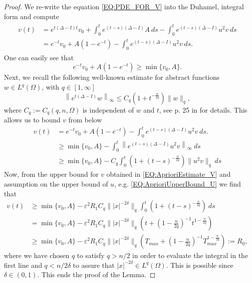 \documentclass[12pt, a4paper]{article}
\theoremstyle{break}
\theoremstyle{break}
\theoremstyle{break}
\theoremstyle{break}
\theoremstyle{break}
\theoremstyle{break}
\theoremstyle{break}
\begin{document}
\begin{proof}
    We re-write the equation \eqref{EQ:PDE_FOR_V} into the Duhamel, integral form and compute
    \begin{align}
        \begin{split}
            \label{EQ:Duhamel_FOR_V}
            v(t) 
            &= e^{t(\Delta - I) t} v_0 + \int_0^t e^{(t-s)(\Delta - I)} A\:ds - \int_0^t e^{(t-s)(\Delta - I)} u^2 v\:ds \\
            &= e^{-t} v_0 + A(1 - e^{-t}) - \int_0^t e^{(t-s)(\Delta - I)} u^2 v\:ds.
        \end{split}
    \end{align}
    One can easily see that
    \begin{equation*}
        e^{-t} v_0 + A (1 - e^{-t}) \geq \min\{ v_0, A \}.
    \end{equation*}
    Next, we recall the following well-known estimate for abstract functions $w \in L^q(\Omega)$, with $q \in [1, \infty]$
    \begin{equation*}
        \left\| e^{t(\Delta - I)} w \right\|_\infty \leq C_q\left( 1 + t^{-\frac{n}{2q}} \right) \| w \|_q,
    \end{equation*}
    where $C_q := C_q(q, n, \Omega)$ is independent of $w$ and $t$, see p. 25 in \cite{Rothe2006} for details. This allows us to bound $v$ from below
    \begin{align*}
        v(t) 
        &= e^{-t} v_0 + A(1 - e^{-t}) - \int_0^t e^{(t-s)(\Delta - I)} u^2 v\:ds. \\
        &\geq \min\{v_0, A\} -  \int_0^t \left\| e^{(t-s)(\Delta - I)} u^2 v \right\|_\infty  \:ds \\
        &\geq \min\{v_0, A\} - C_q \int_0^t \left( 1 + (t-s)^{-\frac{n}{2q}} \right) \| u^2 v \|_q \:ds
    \end{align*}
    Now, from the upper bound for $v$ obtained in \eqref{EQ:AprioriEstimate_V} and assumption on the upper bound of $u$, e.g. \eqref{EQ:AprioriUpperBound_U} we find that
    \begin{align*}
        v(t)
        &\geq \min\{v_0, A\} - \varepsilon^2 R_1 C_q \| |x|^{-2\delta} \|_q \int_0^t \left( 1 + (t-s)^{-\frac{n}{2q}} \right) \:ds \\
        &= \min\{v_0, A\} - \varepsilon^2 R_1 C_q \| |x|^{-2\delta} \|_q \left( t + \left(1 - \frac{n}{2q}\right)^{-1} t^{1-\frac{n}{2q}} \right) \\
        &\geq \min\{v_0, A\} - \varepsilon^2 R_1 C_q \| |x|^{-2\delta} \|_q \left(T_{max} + \left( 1 - \frac{n}{2q}\right)^{-1} T_{max}^{1-\frac{n}{2q}} \right) := R_0,
    \end{align*}
    where we have chosen $q$ to satisfy $q > n/2$ in order to evaluate the integral in the first line and $q < n/2\delta$ to assure that $|x|^{-2\delta} \in L^q(\Omega)$. This is possible since $\delta \in (0,1)$. This ends the proof of the Lemma.
\end{proof}
\end{document}
